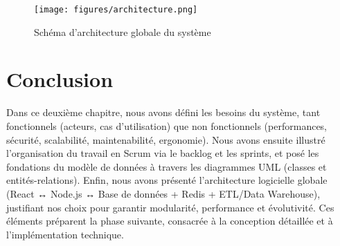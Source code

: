 \documentclass[12pt,a4paper]{report}
\begin{document}
\begin{figure}[H]
  \centering
  \texttt{[image: figures/architecture.png]}
  \caption{Schéma d’architecture globale du système}
  \label{fig:architecture_diagram}
\end{figure}



\section*{Conclusion}
Dans ce deuxième chapitre, nous avons défini les besoins du système, tant fonctionnels (acteurs, cas d’utilisation) que non fonctionnels (performances, sécurité, scalabilité, maintenabilité, ergonomie). Nous avons ensuite illustré l’organisation du travail en Scrum via le backlog et les sprints, et posé les fondations du modèle de données à travers les diagrammes UML (classes et entités-relations). Enfin, nous avons présenté l’architecture logicielle globale (React ↔ Node.js ↔ Base de données + Redis + ETL/Data Warehouse), justifiant nos choix pour garantir modularité, performance et évolutivité. Ces éléments préparent la phase suivante, consacrée à la conception détaillée et à l’implémentation technique.
\end{document}
